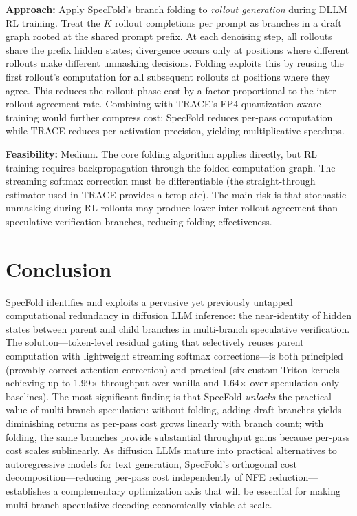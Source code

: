 \documentclass[11pt,a4paper]{article}
\begin{document}
\textbf{Approach:} Apply SpecFold's branch folding to \emph{rollout generation} during DLLM RL training. Treat the $K$ rollout completions per prompt as branches in a draft graph rooted at the shared prompt prefix. At each denoising step, all rollouts share the prefix hidden states; divergence occurs only at positions where different rollouts make different unmasking decisions. Folding exploits this by reusing the first rollout's computation for all subsequent rollouts at positions where they agree. This reduces the rollout phase cost by a factor proportional to the inter-rollout agreement rate. Combining with TRACE's FP4 quantization-aware training would further compress cost: SpecFold reduces per-pass computation while TRACE reduces per-activation precision, yielding multiplicative speedups.

\textbf{Feasibility:} Medium. The core folding algorithm applies directly, but RL training requires backpropagation through the folded computation graph. The streaming softmax correction must be differentiable (the straight-through estimator used in TRACE provides a template). The main risk is that stochastic unmasking during RL rollouts may produce lower inter-rollout agreement than speculative verification branches, reducing folding effectiveness.

\section{Conclusion}
SpecFold identifies and exploits a pervasive yet previously untapped computational redundancy in diffusion LLM inference: the near-identity of hidden states between parent and child branches in multi-branch speculative verification. The solution---token-level residual gating that selectively reuses parent computation with lightweight streaming softmax corrections---is both principled (provably correct attention correction) and practical (six custom Triton kernels achieving up to 1.99$\times$ throughput over vanilla and 1.64$\times$ over speculation-only baselines). The most significant finding is that SpecFold \emph{unlocks} the practical value of multi-branch speculation: without folding, adding draft branches yields diminishing returns as per-pass cost grows linearly with branch count; with folding, the same branches provide substantial throughput gains because per-pass cost scales sublinearly. As diffusion LLMs mature into practical alternatives to autoregressive models for text generation, SpecFold's orthogonal cost decomposition---reducing per-pass cost independently of NFE reduction---establishes a complementary optimization axis that will be essential for making multi-branch speculative decoding economically viable at scale.
\end{document}
